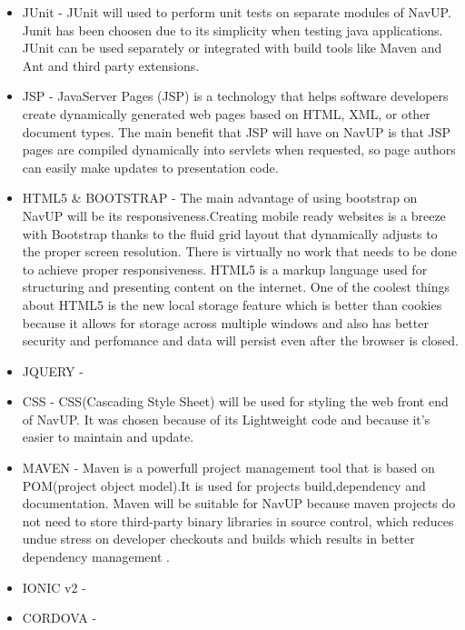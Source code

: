 \begin{itemize}
	\item JUnit - JUnit will used to perform unit tests on separate modules of NavUP. Junit has been choosen due to its simplicity when testing java applications. JUnit can be used separately or integrated with build tools like Maven and Ant and third party extensions.
	
	\item JSP - JavaServer Pages (JSP) is a technology that helps software developers create dynamically generated web pages based on HTML, XML, or other document types. The main benefit that JSP will have on NavUP is that JSP pages are compiled dynamically into servlets when requested, so page authors can easily make updates to presentation code.
	
	\item HTML5 \& BOOTSTRAP - The main advantage of using bootstrap on NavUP will be its responsiveness.Creating mobile ready websites is a breeze with Bootstrap thanks to the fluid grid layout that dynamically adjusts to the proper screen resolution. There is virtually no work that needs to be done to achieve proper responsiveness. HTML5 is a markup language used for structuring and presenting content on the internet. One of the coolest things about HTML5 is the new local storage feature which is better than cookies because it allows for storage across multiple windows and also has better security and perfomance and data will persist even after the browser is closed.
	
	\item JQUERY - 
	
	\item CSS - CSS(Cascading Style Sheet) will be used for styling the web front end of NavUP. It was chosen because of its Lightweight code and because it's easier to maintain and update. 
	
	\item MAVEN - Maven is a powerfull project management tool that is based on POM(project object model).It is used for projects build,dependency and documentation. Maven will be suitable for NavUP because maven projects do not need to store third-party binary libraries in source control, which reduces undue stress on developer checkouts and builds which results in better dependency management
.	
	
	
	\item IONIC v2 - 
	
	\item CORDOVA - 
	
	
	
\end{itemize}
